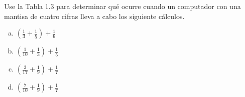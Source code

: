 \begin{enunciado}
 Use la Tabla 1.3 para determinar qu\'e ocurre cuando un computador con una mantisa de cuatro cifras lleva a cabo los siguiente c\'alculos.
 \begin{multicols}{2}
  \begin{enumerate}[(a)]
   \item $\left( \frac{1}{3} + \frac{1}{5} \right) + \frac{1}{6}$
   \item $\left( \frac{1}{10} + \frac{1}{3} \right) + \frac{1}{5}$
  \end{enumerate}
 \end{multicols}
 \begin{multicols}{2}
  \begin{enumerate}[(a)]
   \setcounter{enumii}{2}
   \item $\left( \frac{3}{17} + \frac{1}{9} \right) + \frac{1}{7}$
   \item $\left( \frac{7}{10} + \frac{1}{9} \right) + \frac{1}{7}$
  \end{enumerate}
 \end{multicols}
\end{enunciado}

